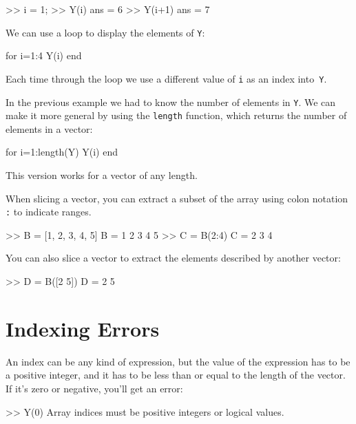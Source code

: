 \begin{code}
>> i = 1;
>> Y(i)
ans = 6
>> Y(i+1)
ans = 7
\end{code}

We can use a loop to display the elements of \lstinline{Y}:


\begin{code}
for i=1:4
     Y(i)
end
\end{code}

Each time through the loop we use a different value of \lstinline{i}
as an index into~\lstinline{Y}.


In the previous example we had to know the number
of elements in \lstinline{Y}.  We can make it more general by using
the \lstinline{length} function, which returns the number of elements
in a vector:

\begin{code}
for i=1:length(Y)
     Y(i)
end
\end{code}

This version works for a vector of any length.

When slicing a vector, you can extract a subset of the array using colon notation \lstinline{:} to indicate ranges.
\begin{code}
    >> B = [1, 2, 3, 4, 5]
    B =
         1     2     3     4     5
    >> C = B(2:4)
    C =
         2     3     4
\end{code}

You can also slice a vector to extract the elements described by another vector:
\begin{code}
    >> D = B([2 5])
    D =
         2     5
\end{code}

\section{Indexing Errors}


An index can be any kind of expression, but the value of the
expression has to be a positive integer, and it has to be
less than or equal to the length of the vector.  If it's
zero or negative, you'll get an error:

\begin{code}
>> Y(0)
Array indices must be positive integers or logical values.
\end{code}

